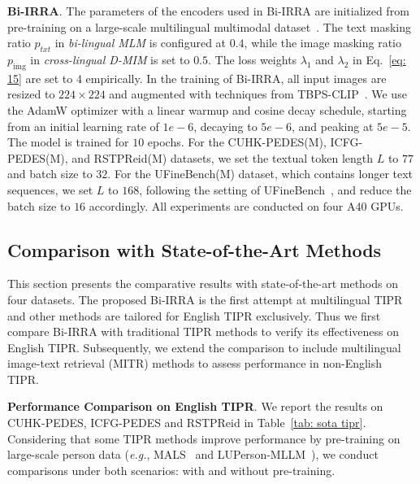 \documentclass[10pt,journal,compsoc]{IEEEtran}
\begin{document}
\textbf{Bi-IRRA}. 
The parameters of the encoders used in Bi-IRRA are initialized from pre-training on a large-scale multilingual multimodal dataset~\cite{zeng2023x}. 
The text masking ratio \(p_{txt}\) in \emph{bi-lingual MLM} is configured at \(0.4\), while the image masking ratio \(p_{\text{img}}\) in \emph{cross-lingual D-MIM} is set to \(0.5\). The loss weights \(\lambda_1\) and \(\lambda_2\) in Eq.~\eqref{eq: 15} are set to \(4\) empirically. 
In the training of Bi-IRRA, all input images are resized to \(224 \times 224\) and augmented with techniques from TBPS-CLIP~\cite{cao2024empirical}. We use the AdamW optimizer with a linear warmup and cosine decay schedule, starting from an initial learning rate of \(1e-6\), decaying to \(5e-6\), and peaking at \(5e-5\). The model is trained for \(10\) epochs. For the CUHK-PEDES(M), ICFG-PEDES(M), and RSTPReid(M) datasets, we set the textual token length \(L\) to \(77\) and batch size to \(32\). For the UFineBench(M) dataset, which contains longer text sequences, we set \(L\) to \(168\), following the setting of UFineBench~\cite{zuo2024ufinebench}, and reduce the batch size to \(16\) accordingly. All experiments are conducted on four A40 GPUs.

\subsection{Comparison with State-of-the-Art Methods}
This section presents the comparative results with state-of-the-art methods on four datasets.
The proposed Bi-IRRA is the first attempt at multilingual TIPR and other methods are tailored for English TIPR exclusively. Thus we first compare Bi-IRRA with traditional TIPR methods to verify its effectiveness on English TIPR.
Subsequently, we extend the comparison to include multilingual image-text retrieval (MITR) methods to assess performance in non-English TIPR. 




\textbf{Performance Comparison on English TIPR}. 
We report the results on CUHK-PEDES, ICFG-PEDES and RSTPReid in Table~\ref{tab: sota tipr}. Considering that some TIPR methods improve performance by pre-training on large-scale person data (\emph{e.g.}, MALS~\cite{yang2023towards} and LUPerson-MLLM~\cite{tan2024harnessing}), we conduct comparisons under both scenarios: with and without pre-training.
\end{document}
